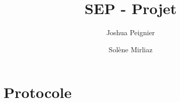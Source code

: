 \documentclass{article}
\title{SEP - Projet}
\author{Joshua Peignier \and Solène Mirliaz}
\begin{document}
\maketitle
\section{Protocole}
\end{document}
